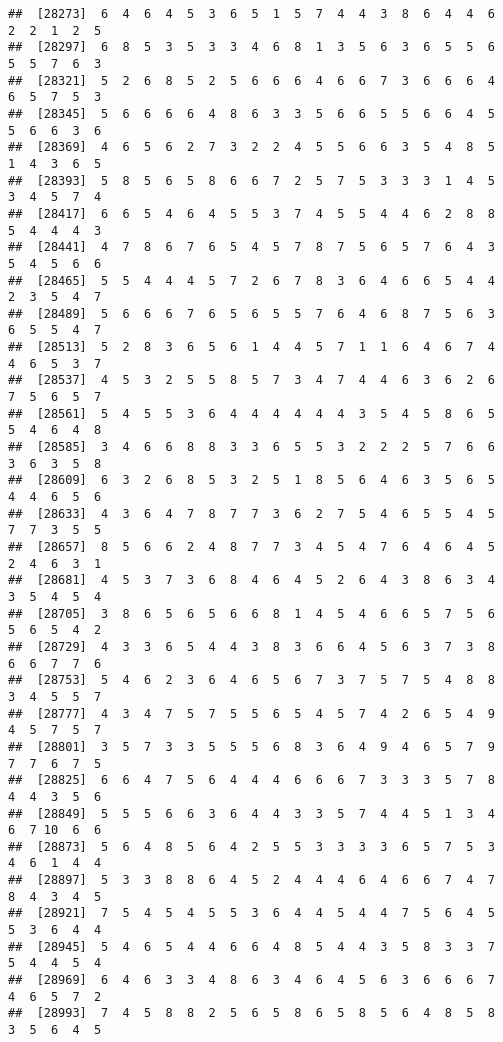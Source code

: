 \documentclass[
]{book}
\begin{document}
\begin{verbatim}
##  [28273]  6  4  6  4  5  3  6  5  1  5  7  4  4  3  8  6  4  4  6  2  2  1  2  5
##  [28297]  6  8  5  3  5  3  3  4  6  8  1  3  5  6  3  6  5  5  6  5  5  7  6  3
##  [28321]  5  2  6  8  5  2  5  6  6  6  4  6  6  7  3  6  6  6  4  6  5  7  5  3
##  [28345]  5  6  6  6  6  4  8  6  3  3  5  6  6  5  5  6  6  4  5  5  6  6  3  6
##  [28369]  4  6  5  6  2  7  3  2  2  4  5  5  6  6  3  5  4  8  5  1  4  3  6  5
##  [28393]  5  8  5  6  5  8  6  6  7  2  5  7  5  3  3  3  1  4  5  3  4  5  7  4
##  [28417]  6  6  5  4  6  4  5  5  3  7  4  5  5  4  4  6  2  8  8  5  4  4  4  3
##  [28441]  4  7  8  6  7  6  5  4  5  7  8  7  5  6  5  7  6  4  3  5  4  5  6  6
##  [28465]  5  5  4  4  4  5  7  2  6  7  8  3  6  4  6  6  5  4  4  2  3  5  4  7
##  [28489]  5  6  6  6  7  6  5  6  5  5  7  6  4  6  8  7  5  6  3  6  5  5  4  7
##  [28513]  5  2  8  3  6  5  6  1  4  4  5  7  1  1  6  4  6  7  4  4  6  5  3  7
##  [28537]  4  5  3  2  5  5  8  5  7  3  4  7  4  4  6  3  6  2  6  7  5  6  5  7
##  [28561]  5  4  5  5  3  6  4  4  4  4  4  4  3  5  4  5  8  6  5  5  4  6  4  8
##  [28585]  3  4  6  6  8  8  3  3  6  5  5  3  2  2  2  5  7  6  6  3  6  3  5  8
##  [28609]  6  3  2  6  8  5  3  2  5  1  8  5  6  4  6  3  5  6  5  4  4  6  5  6
##  [28633]  4  3  6  4  7  8  7  7  3  6  2  7  5  4  6  5  5  4  5  7  7  3  5  5
##  [28657]  8  5  6  6  2  4  8  7  7  3  4  5  4  7  6  4  6  4  5  2  4  6  3  1
##  [28681]  4  5  3  7  3  6  8  4  6  4  5  2  6  4  3  8  6  3  4  3  5  4  5  4
##  [28705]  3  8  6  5  6  5  6  6  8  1  4  5  4  6  6  5  7  5  6  5  6  5  4  2
##  [28729]  4  3  3  6  5  4  4  3  8  3  6  6  4  5  6  3  7  3  8  6  6  7  7  6
##  [28753]  5  4  6  2  3  6  4  6  5  6  7  3  7  5  7  5  4  8  8  3  4  5  5  7
##  [28777]  4  3  4  7  5  7  5  5  6  5  4  5  7  4  2  6  5  4  9  4  5  7  5  7
##  [28801]  3  5  7  3  3  5  5  5  6  8  3  6  4  9  4  6  5  7  9  7  7  6  7  5
##  [28825]  6  6  4  7  5  6  4  4  4  6  6  6  7  3  3  3  5  7  8  4  4  3  5  6
##  [28849]  5  5  5  6  6  3  6  4  4  3  3  5  7  4  4  5  1  3  4  6  7 10  6  6
##  [28873]  5  6  4  8  5  6  4  2  5  5  3  3  3  3  6  5  7  5  3  4  6  1  4  4
##  [28897]  5  3  3  8  8  6  4  5  2  4  4  4  6  4  6  6  7  4  7  8  4  3  4  5
##  [28921]  7  5  4  5  4  5  5  3  6  4  4  5  4  4  7  5  6  4  5  5  3  6  4  4
##  [28945]  5  4  6  5  4  4  6  6  4  8  5  4  4  3  5  8  3  3  7  5  4  4  5  4
##  [28969]  6  4  6  3  3  4  8  6  3  4  6  4  5  6  3  6  6  6  7  4  6  5  7  2
##  [28993]  7  4  5  8  8  2  5  6  5  8  6  5  8  5  6  4  8  5  8  3  5  6  4  5

\end{verbatim}
\end{document}

